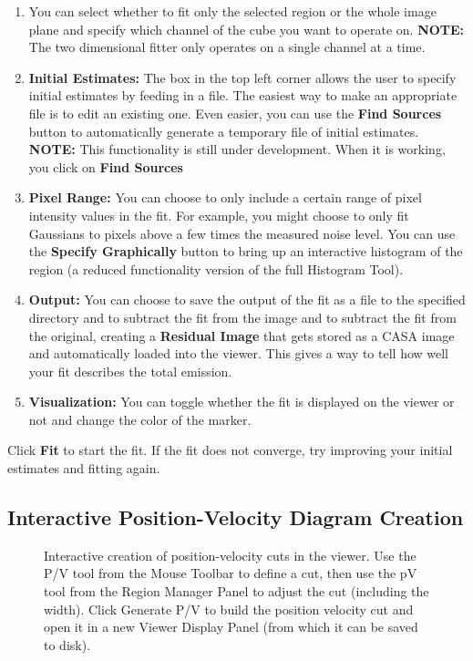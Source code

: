 \begin{enumerate}
\item You can select whether to fit only the selected region or the whole image plane and specify which channel of the cube you want to
operate on. {\bf NOTE:} The two dimensional fitter only operates on
a single channel at a time.
\item {\bf Initial Estimates:} The box in the top left corner allows the user to specify initial estimates by feeding in a file. The easiest way
to make an appropriate file is to edit an existing one. Even easier, you can use the {\bf Find Sources} button to automatically generate a
temporary file of initial estimates. {\bf NOTE:} This functionality is still under development. When it is working, you click on {\bf Find Sources}
\item {\bf Pixel Range:} You can choose to only include a certain range of pixel intensity values in the fit. For example, you might choose
to only fit Gaussians to pixels above a few times the measured noise level. You can use the {\bf Specify Graphically} button to bring up
an interactive histogram of the region (a reduced functionality version of the full Histogram Tool).
\item {\bf Output:} You can choose to save the output of the fit as a file to the specified directory and to subtract the fit from the image and
to subtract the fit from the original, creating a {\bf Residual Image} that gets stored as a CASA image and automatically loaded into the 
viewer. This gives a way to tell how well your fit describes the total emission.
\item {\bf Visualization:} You can toggle whether the fit is displayed on the viewer or not and change the color of the marker.
\end{enumerate}

Click {\bf Fit} to start the fit. If the fit does not converge, try improving your initial estimates and fitting again.

\subsection{Interactive Position-Velocity Diagram Creation}
\label{section:display.image.pvdiagram}

\begin{figure}[h!]
\begin{center}
\caption{\label{fig:viewer_pvcut} Interactive creation of position-velocity cuts in the viewer. Use the P/V tool from the Mouse Toolbar to
define a cut, then use the pV tool from the Region Manager Panel to adjust the cut (including the width). Click Generate P/V to build
the position velocity cut and open it in a new Viewer Display Panel (from which it can be saved to disk).}
\hrulefill
\end{center}
\end{figure}


